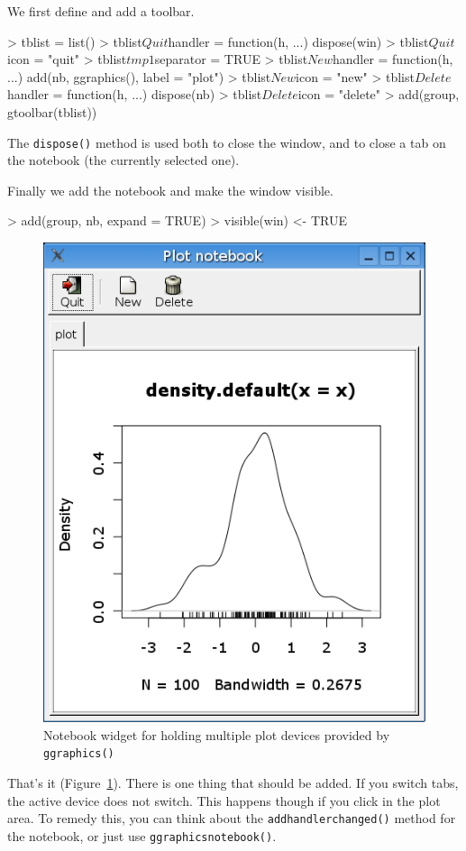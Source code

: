 \documentclass[12pt]{article}
\newcommand{\RFunc}[1]{\texttt{#1()}}
\begin{document}
We first define and add a toolbar.
\begin{Schunk}
\begin{Sinput}
> tblist = list()
> tblist$Quit$handler = function(h, ...) dispose(win)
> tblist$Quit$icon = "quit"
> tblist$tmp1$separator = TRUE
> tblist$New$handler = function(h, ...) add(nb, ggraphics(), label = "plot")
> tblist$New$icon = "new"
> tblist$Delete$handler = function(h, ...) dispose(nb)
> tblist$Delete$icon = "delete"
> add(group, gtoolbar(tblist))
\end{Sinput}
\end{Schunk}
The \RFunc{dispose} method is used both to close the window, and to close
a tab on the notebook (the currently selected one).

Finally we add the notebook and make the window visible.
\begin{Schunk}
\begin{Sinput}
> add(group, nb, expand = TRUE)
> visible(win) <- TRUE
\end{Sinput}
\end{Schunk}

\begin{figure}[htbp]
  \centering
  \includegraphics[width=.6\textwidth]{notebook}
  \caption{Notebook widget for holding multiple plot devices provided by \RFunc{ggraphics}}
  \label{fig:notebook}
\end{figure}

That's it (Figure~\ref{fig:notebook}). There is one thing that should
be added. If you switch tabs, the active device does not switch. This
happens though if you click in the plot area. To remedy this, you can
think about the \RFunc{addhandlerchanged} method for the notebook, or
just use \RFunc{ggraphicsnotebook}.
\end{document}
